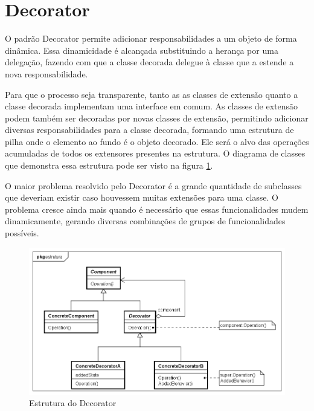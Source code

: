 \section{Decorator}

O padrão Decorator permite adicionar responsabilidades a um 
objeto de forma dinâmica. Essa dinamicidade é alcançada 
substituindo a herança por uma delegação, fazendo com 
que a classe decorada delegue à classe que a estende 
a nova responsabilidade.

Para que o processo seja transparente, tanto as 
as classes de extensão quanto a classe decorada 
implementam uma interface em comum. As classes 
de extensão podem também ser decoradas por 
novas classes de extensão, permitindo adicionar 
diversas responsabilidades para a classe decorada, 
formando uma estrutura de pilha onde o elemento ao 
fundo é o objeto decorado. Ele será o 
alvo das operações acumuladas de todos os extensores 
presentes na estrutura. O diagrama de classes que 
demonstra essa estrutura pode ser visto na figura 
\ref{decorator_struct}.

O maior problema resolvido pelo Decorator é a grande 
quantidade de subclasses que deveriam existir caso houvessem 
muitas extensões para uma classe. O problema cresce ainda 
mais quando é necessário que essas funcionalidades mudem 
dinamicamente, gerando diversas combinações de grupos de 
funcionalidades possíveis.

\begin{figure}[htb]
	\caption{\label{decorator_struct}Estrutura do Decorator}
	\begin{center}
	    \includegraphics[scale=0.5]{5_padroes-contexto-funcional/5.2_estruturais/5.2.4_decorator/decorator_estrutura.png}
	\end{center}
\end{figure}

